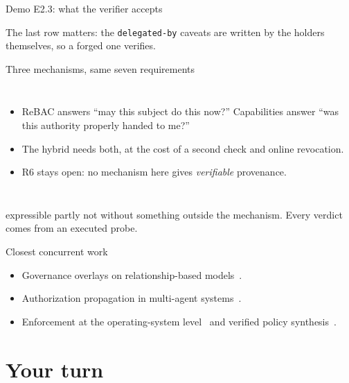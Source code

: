 \documentclass[aspectratio=169, 10pt]{beamer}
\begin{document}
\begin{frame}{Demo E2.3: what the verifier accepts}
  \centering{}\par
  \vspace{2mm}
  {\small The last row matters: the \texttt{delegated-by} caveats are written by the holders themselves, so a forged one verifies.}
\end{frame}

\begin{frame}{Three mechanisms, same seven requirements}
  \begin{columns}[T]
    \small
    \begin{itemize}
      \item ReBAC answers ``may this subject do this now?'' Capabilities answer ``was this authority properly handed to me?''
      \item The hybrid needs both, at the cost of a second check and online revocation.
      \item R6 stays open: no mechanism here gives \emph{verifiable} provenance.
    \end{itemize}
  \end{columns}
  \vspace{2mm}
  {\scriptsize \cmark{} expressible \quad \pmark{} partly \quad \xmark{} not without something outside the mechanism. Every verdict comes from an executed probe.}
\end{frame}

\begin{frame}{Closest concurrent work}
  \small
  \begin{itemize}
    \item Governance overlays on relationship-based models \,\pre.
    \item Authorization propagation in multi-agent systems \,\pre.
    \item Enforcement at the operating-system level \,\pre{} and verified policy synthesis \,\pre.
  \end{itemize}
\end{frame}

\section{Your turn}
\end{document}
